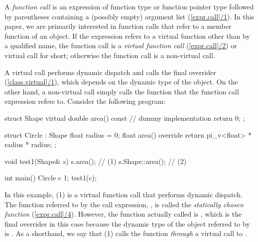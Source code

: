 
A \emph{function call} is an expression of function type or function pointer type followed by parentheses containing a (possibly empty) argument list (\href{https://eel.is/c++draft/expr.call#1}{[expr.call]/1}). In this paper, we are primarily interested in function calls that refer to a member function of an object. If the expression refers to a virtual function other than by a qualified name, the function call is a \emph{virtual function call} (\href{https://eel.is/c++draft/expr.call#2}{[expr.call]/2}) or virtual call for short; otherwise the function call is a non-virtual call.

A virtual call performs dynamic dispatch and calls the final overrider (\href{https://eel.is/c++draft/expr.call#2.sentence-2}{[class.virtual]/1}), which depends on the dynamic type of the object. On the other hand, a non-virtual call simply calls the function that the function call expression refers to. Consider the following program:

\begin{codeblock}
struct Shape {
  virtual double area() const { 
    // dummy implementation
    return 0; 
  }
};

struct Circle : Shape {
  float radius = 0;
  float area() override { 
    return pi_v<float> * radius * radius; 
  }
};

void test1(Shape& s) {
  s.area();        // (1)
  s.Shape::area(); // (2)
}

int main() {
  Circle c {1};
  test1(c);
}
\end{codeblock}

In this example, (1) is a virtual function call that performs dynamic dispatch. The function referred to by the call expression, , is called the \emph{statically chosen function} (\href{https://eel.is/c++draft/expr.call#4.sentence-1}{[expr.call]/4}). However, the function actually called is , which is the final overrider in this case because the dynamic type of the object referred to by  is . As a shorthand, we say that (1) calls the function  \emph{through} a virtual call to .

